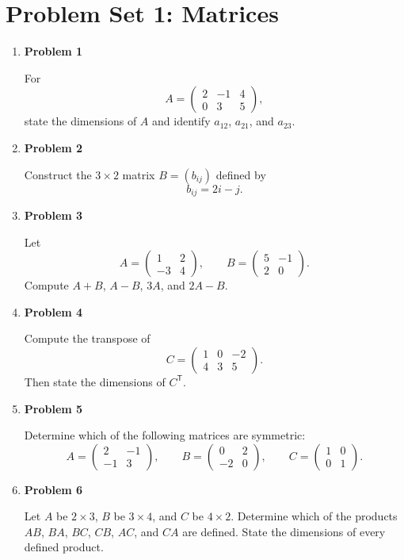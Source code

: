 \section{Problem Set 1: Matrices}

\begin{enumerate}
\item \textbf{Problem 1}\par
For
\[
A=\begin{pmatrix}
2&-1&4\\
0&3&5
\end{pmatrix},
\]
state the dimensions of \(A\) and identify \(a_{12}\), \(a_{21}\), and \(a_{23}\).

\item \textbf{Problem 2}\par
Construct the \(3\times 2\) matrix \(B=(b_{ij})\) defined by
\[
b_{ij}=2i-j.
\]

\item \textbf{Problem 3}\par
Let
\[
A=\begin{pmatrix}1&2\\-3&4\end{pmatrix},
\qquad
B=\begin{pmatrix}5&-1\\2&0\end{pmatrix}.
\]
Compute \(A+B\), \(A-B\), \(3A\), and \(2A-B\).

\item \textbf{Problem 4}\par
Compute the transpose of
\[
C=\begin{pmatrix}
1&0&-2\\
4&3&5
\end{pmatrix}.
\]
Then state the dimensions of \(C^{\mathsf T}\).

\item \textbf{Problem 5}\par
Determine which of the following matrices are symmetric:
\[
A=\begin{pmatrix}2&-1\\-1&3\end{pmatrix},
\qquad
B=\begin{pmatrix}0&2\\-2&0\end{pmatrix},
\qquad
C=\begin{pmatrix}1&0\\0&1\end{pmatrix}.
\]

\item \textbf{Problem 6}\par
Let \(A\) be \(2\times3\), \(B\) be \(3\times4\), and \(C\) be \(4\times2\). Determine which of the products \(AB\), \(BA\), \(BC\), \(CB\), \(AC\), and \(CA\) are defined. State the dimensions of every defined product.


\end{enumerate}
